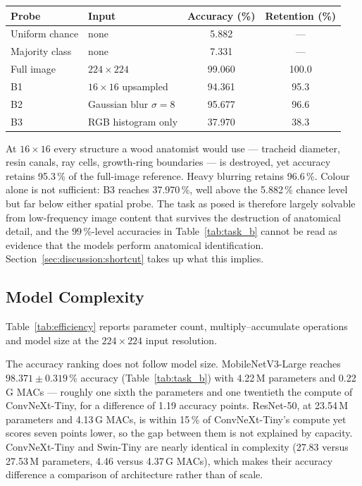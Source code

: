 \begin{center}
\small
\begin{tabular}{llcc}
\toprule
\textbf{Probe} & \textbf{Input} & \textbf{Accuracy (\%)} & \textbf{Retention (\%)} \\
\midrule
Uniform chance      & none                        & 5.882  & --- \\
Majority class      & none                        & 7.331  & --- \\
Full image          & $224\times224$              & 99.060 & 100.0 \\
B1                  & $16\times16$ upsampled      & 94.361 & 95.3 \\
B2                  & Gaussian blur $\sigma=8$    & 95.677 & 96.6 \\
B3                  & RGB histogram only          & 37.970 & 38.3 \\
\bottomrule
\end{tabular}
\end{center}

At $16\times16$ every structure a wood anatomist would use --- tracheid
diameter, resin canals, ray cells, growth-ring boundaries --- is destroyed,
yet accuracy retains 95.3\,\% of the full-image reference. Heavy blurring
retains 96.6\,\%. Colour alone is not sufficient: B3 reaches 37.970\,\%,
well above the 5.882\,\% chance level but far below either spatial probe.
The task as posed is therefore largely solvable from low-frequency image
content that survives the destruction of anatomical detail, and the
$99$\,\%-level accuracies in Table~\ref{tab:task_b} cannot be read as
evidence that the models perform anatomical identification.
Section~\ref{sec:discussion:shortcut} takes up what this implies.

\subsection{Model Complexity}
\label{sec:results:efficiency}

Table~\ref{tab:efficiency} reports parameter count, multiply--accumulate
operations and model size at the $224\times224$ input resolution.

The accuracy ranking does not follow model size. MobileNetV3-Large reaches
$98.371 \pm 0.319$\,\% accuracy (Table~\ref{tab:task_b}) with 4.22\,M
parameters and 0.22\,G MACs --- roughly one sixth the parameters and one
twentieth the compute of ConvNeXt-Tiny, for a difference of 1.19 accuracy
points. ResNet-50, at 23.54\,M parameters and 4.13\,G MACs, is within 15\,\%
of ConvNeXt-Tiny's compute yet scores seven points lower, so the gap between
them is not explained by capacity. ConvNeXt-Tiny and Swin-Tiny are nearly
identical in complexity (27.83 versus 27.53\,M parameters, 4.46 versus
4.37\,G MACs), which makes their accuracy difference a comparison of
architecture rather than of scale.

